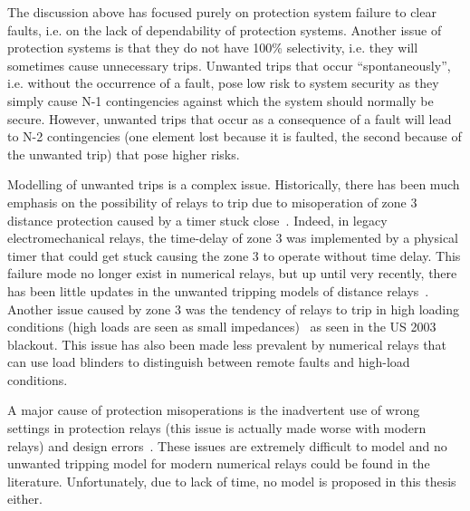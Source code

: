 The discussion above has focused purely on protection system failure to clear faults, i.e. on the lack of dependability of protection systems. Another issue of protection systems is that they do not have 100\% selectivity, i.e. they will sometimes cause unnecessary trips. Unwanted trips that occur ``spontaneously'', i.e. without the occurrence of a fault, pose low risk to system security as they simply cause N-1 contingencies against which the system should normally be secure. However, unwanted trips that occur as a consequence of a fault will lead to N-2 contingencies (one element lost because it is faulted, the second because of the unwanted trip) that pose higher risks.

Modelling of unwanted trips is a complex issue. Historically, there has been much emphasis on the possibility of relays to trip due to misoperation of zone 3 distance protection caused by a timer stuck close~\cite{ZoneVulnerability, OriginalManchesterModel}. Indeed, in legacy electromechanical relays, the time-delay of zone 3 was implemented by a physical timer that could get stuck causing the zone 3 to operate without time delay. This failure mode no longer exist in numerical relays, but up until very recently, there has been little updates in the unwanted tripping models of distance relays~\cite{Alexandre_PMAPS}. Another issue caused by zone 3 was the tendency of relays to trip in high loading conditions (high loads are seen as small impedances)~\cite{3rdZoneRevisited} as seen in the US 2003 blackout. This issue has also been made less prevalent by numerical relays that can use load blinders to distinguish between remote faults and high-load conditions.

A major cause of protection misoperations is the inadvertent use of wrong settings in protection relays (this issue is actually made worse with modern relays) and design errors~\cite{ProtectionMisoperationsBian2012}. These issues are extremely difficult to model and no unwanted tripping model for modern numerical relays could be found in the literature. Unfortunately, due to lack of time, no model is proposed in this thesis either.

